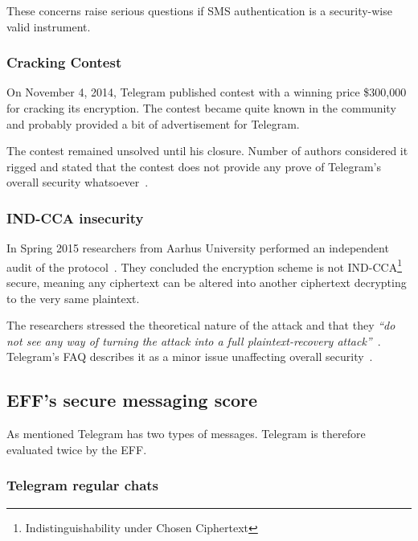 \documentclass[thesis=M,english]{FITthesis}[2012/10/20]
\begin{document}
These concerns raise serious questions if SMS authentication is a security-wise valid instrument.

\subsubsection{Cracking Contest}

On November 4, 2014, Telegram published contest with a winning price \$300,000 for cracking its encryption. The contest became quite known in the community and probably provided a bit of advertisement for Telegram.

The contest remained unsolved until his closure. Number of authors considered it rigged and stated that the contest does not provide any prove of Telegram's overall security whatsoever~\cite{telegramcontestfail,telegramcontestfail2}.

\subsubsection{IND-CCA insecurity}

In Spring 2015 researchers from Aarhus University performed an independent audit of the protocol~\cite{telegram-aarhus}. They concluded the encryption scheme is not IND-CCA\footnote{Indistinguishability under Chosen Ciphertext} secure, meaning any ciphertext can be altered into another ciphertext decrypting to the very same plaintext.

The researchers stressed the theoretical nature of the attack and that they \emph{``do not see any way of turning the attack into a full plaintext-recovery attack''}~\cite{telegram-aarhus}. Telegram's FAQ describes it as a minor issue unaffecting overall security~\cite{telegram-techfaq}.


\subsection{EFF's secure messaging score}

As mentioned Telegram has two types of messages. Telegram is therefore evaluated twice by the EFF.


\subsubsection{Telegram regular chats}
\end{document}
